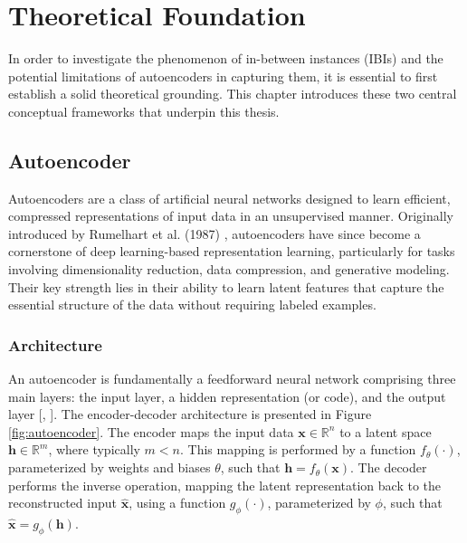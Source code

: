 \chapter{Theoretical Foundation} \label{ch:theoretical_foundation}

In order to investigate the phenomenon of in-between instances (IBIs) and the potential limitations of autoencoders in capturing them, it is essential to first establish a solid theoretical grounding. This chapter introduces these two central conceptual frameworks that underpin this thesis.

\section{Autoencoder}

Autoencoders are a class of artificial neural networks designed to learn efficient, compressed representations of input data in an unsupervised manner. Originally introduced by Rumelhart et al. (1987) \cite{Rumelhart86}, autoencoders have since become a cornerstone of deep learning-based representation learning, particularly for tasks involving dimensionality reduction, data compression, and generative modeling. Their key strength lies in their ability to learn latent features that capture the essential structure of the data without requiring labeled examples.

\subsection{Architecture}

An autoencoder is fundamentally a feedforward neural network comprising three main layers: the input layer, a hidden representation (or code), and the output layer [\cite{Goodfellow16}, \cite{Berahmand24}]. The encoder-decoder architecture is presented in Figure \ref{fig:autoencoder}. The encoder maps the input data 
$\mathbf{x} \in \mathbb{R}^n$ 
to a latent space 
$\mathbf{h} \in \mathbb{R}^m$, 
where typically $m < n$. This mapping is performed by a function 
$f_{\theta}(\cdot)$, 
parameterized by weights and biases $\theta$, such that 
$\mathbf{h} = f_{\theta}(\mathbf{x})$. 
The decoder performs the inverse operation, mapping the latent representation back to the reconstructed input 
$\hat{\mathbf{x}}$, 
using a function 
$g_{\phi}(\cdot)$, 
parameterized by $\phi$, such that 
$\hat{\mathbf{x}} = g_{\phi}(\mathbf{h})$.

